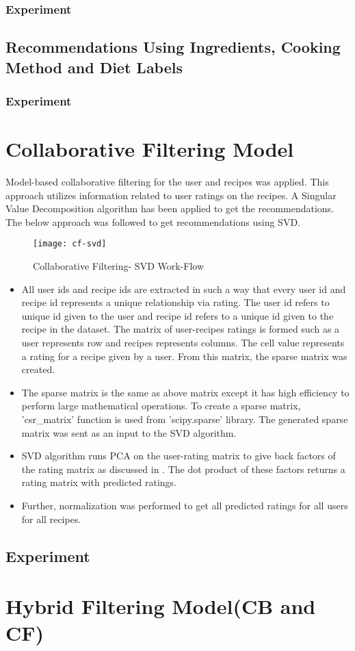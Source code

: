 \subsubsection{Experiment}
\label{sec:cb_ingred_cook_method_exp}
\subsection{Recommendations Using Ingredients, Cooking Method and Diet Labels}
\subsubsection{Experiment}
\label{sec:cb_ingred_cook_method_diet_label_exp}

\section{Collaborative Filtering Model}
Model-based collaborative filtering for the user and recipes was applied. This approach utilizes information related to user ratings on the recipes. A Singular Value Decomposition algorithm has been applied to get the recommendations. The below approach was followed to get recommendations using SVD.

\begin{figure}[H]
	\centering
	\texttt{[image: cf-svd]}
	\caption{Collaborative Filtering- SVD Work-Flow }
	\label{fig:cf-svd}
\end{figure}  

\begin{itemize}
\item All user ids and recipe ids are extracted in such a way that every user id and recipe id represents a unique relationship via rating. The user id refers to unique id given to the user and recipe id refers to a unique id given to the recipe in the dataset. The matrix of user-recipes ratings is formed such as a user represents row and recipes represents columns. The cell value represents a rating for a recipe given by a user. From this matrix, the sparse matrix was created. 
\item The sparse matrix is the same as above matrix except it has high efficiency to perform large mathematical operations. To create a sparse matrix, 'csr\_matrix' function is used from 'scipy.sparse' library. The generated sparse matrix was sent as an input to the SVD algorithm.
\item SVD algorithm runs PCA on the user-rating matrix to give back factors of the rating matrix as discussed in . The dot product of these factors returns a rating matrix with predicted ratings. 
\item Further, normalization was performed to get all predicted ratings for all users for all recipes.
\end{itemize}

\subsection{Experiment}
\label{sec:svd_exp}
\section{Hybrid Filtering Model(CB and CF)}

